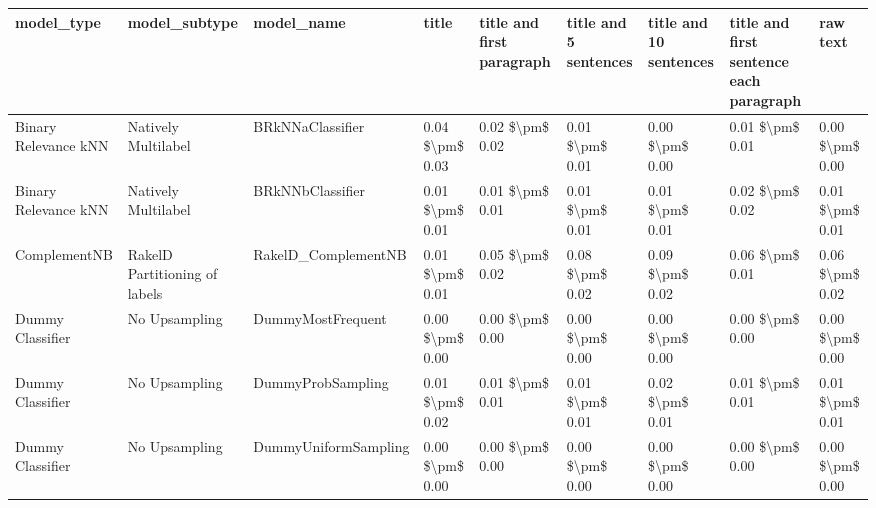 \begin{tabular}{lllllllll}
\toprule
                     model\_type &                 model\_subtype &                                   model\_name &           title & title and first paragraph & title and 5 sentences & title and 10 sentences & title and first sentence each paragraph &            raw text \\
\midrule
           Binary Relevance kNN &           Natively Multilabel &                             BRkNNaClassifier & 0.04 \$\textbackslash pm\$ 0.03 &           0.02 \$\textbackslash pm\$ 0.02 &       0.01 \$\textbackslash pm\$ 0.01 &        0.00 \$\textbackslash pm\$ 0.00 &                         0.01 \$\textbackslash pm\$ 0.01 &     0.00 \$\textbackslash pm\$ 0.00 \\
           Binary Relevance kNN &           Natively Multilabel &                             BRkNNbClassifier & 0.01 \$\textbackslash pm\$ 0.01 &           0.01 \$\textbackslash pm\$ 0.01 &       0.01 \$\textbackslash pm\$ 0.01 &        0.01 \$\textbackslash pm\$ 0.01 &                         0.02 \$\textbackslash pm\$ 0.02 &     0.01 \$\textbackslash pm\$ 0.01 \\
                   ComplementNB & RakelD Partitioning of labels &                          RakelD\_ComplementNB & 0.01 \$\textbackslash pm\$ 0.01 &           0.05 \$\textbackslash pm\$ 0.02 &       0.08 \$\textbackslash pm\$ 0.02 &        0.09 \$\textbackslash pm\$ 0.02 &                         0.06 \$\textbackslash pm\$ 0.01 &     0.06 \$\textbackslash pm\$ 0.02 \\
               Dummy Classifier &                 No Upsampling &                            DummyMostFrequent & 0.00 \$\textbackslash pm\$ 0.00 &           0.00 \$\textbackslash pm\$ 0.00 &       0.00 \$\textbackslash pm\$ 0.00 &        0.00 \$\textbackslash pm\$ 0.00 &                         0.00 \$\textbackslash pm\$ 0.00 &     0.00 \$\textbackslash pm\$ 0.00 \\
               Dummy Classifier &                 No Upsampling &                            DummyProbSampling & 0.01 \$\textbackslash pm\$ 0.02 &           0.01 \$\textbackslash pm\$ 0.01 &       0.01 \$\textbackslash pm\$ 0.01 &        0.02 \$\textbackslash pm\$ 0.01 &                         0.01 \$\textbackslash pm\$ 0.01 &     0.01 \$\textbackslash pm\$ 0.01 \\
               Dummy Classifier &                 No Upsampling &                         DummyUniformSampling & 0.00 \$\textbackslash pm\$ 0.00 &           0.00 \$\textbackslash pm\$ 0.00 &       0.00 \$\textbackslash pm\$ 0.00 &        0.00 \$\textbackslash pm\$ 0.00 &                         0.00 \$\textbackslash pm\$ 0.00 &     0.00 \$\textbackslash pm\$ 0.00 \\

\end{tabular}
